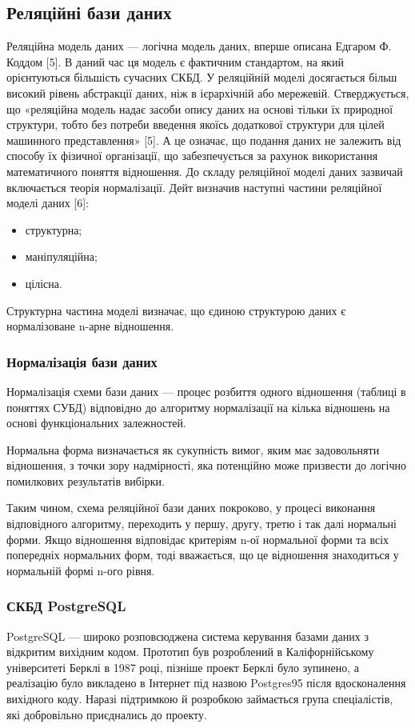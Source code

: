 \subsection{Реляційні бази даних}
Реляційна модель даних — логічна модель даних, вперше описана Едгаром Ф. Коддом [5]. В даний час ця модель є фактичним стандартом, на який орієнтуються більшість сучасних СКБД.
У реляційній моделі досягається більш високий рівень абстракції даних, ніж в ієрархічній або мережевій. Стверджується, що «реляційна модель надає засоби опису даних на основі тільки їх природної структури, тобто без потреби введення якоїсь додаткової структури для цілей машинного представлення» [5]. А це означає, що подання даних не залежить від способу їх фізичної організації, що забезпечується за рахунок використання математичного поняття відношення.
До складу реляційної моделі даних зазвичай включається теорія нормалізації. Дейт визначив наступні частини реляційної моделі даних [6]:
\begin{itemize}
	\item структурна;
	\item маніпуляційна;
	\item цілісна.
\end{itemize}

Структурна частина моделі визначає, що єдиною структурою даних є нормалізоване n-арне відношення.

\subsubsection{Нормалізація бази даних}
Нормалізація схеми бази даних — процес розбиття одного відношення (таблиці в поняттях СУБД) відповідно до алгоритму нормалізації на кілька відношень на основі функціональних залежностей.

Нормальна форма визначається як сукупність вимог, яким має задовольняти відношення, з точки зору надмірності, яка потенційно може призвести до логічно помилкових результатів вибірки.

Таким чином, схема реляційної бази даних покроково, у процесі виконання відповідного алгоритму, переходить у першу, другу, третю і так далі нормальні форми. Якщо відношення відповідає критеріям n-ої нормальної форми та всіх попередніх нормальних форм, тоді вважається, що це відношення знаходиться у нормальній формі n-ого рівня.

\subsubsection{СКБД PostgreSQL}
PostgreSQL — широко розповсюджена система керування базами даних з відкритим вихідним кодом. Прототип був розроблений в Каліфорнійському університеті Берклі в 1987 році, пізніше проект Берклі було зупинено, а реалізацію було викладено в Інтернет під назвою Postgres95 після вдосконалення вихідного коду. Наразі підтримкою й розробкою займається група спеціалістів, які добровільно приєднались до проекту.

